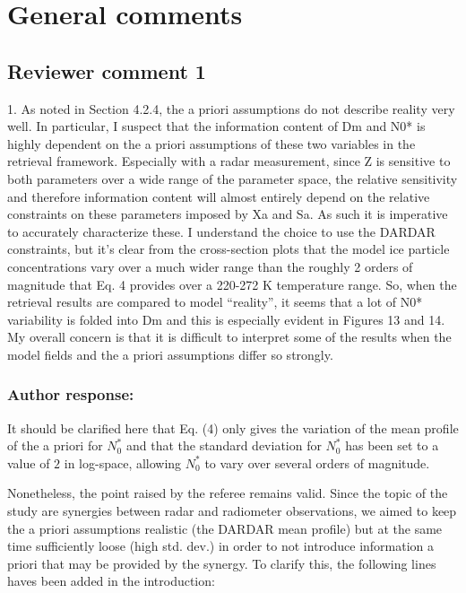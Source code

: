 \documentclass[11pt]{scrartcl}
\author{simon}
\date{\today}
\title{}
\begin{document}
\setlength{\parindent}{0cm}

\section{General comments}

\subsection*{Reviewer comment 1}

1. As noted in Section 4.2.4, the a priori assumptions do not describe reality
very well. In particular, I suspect that the information content of Dm and N0* is
highly dependent on the a priori assumptions of these two variables in the
retrieval framework. Especially with a radar measurement, since Z is sensitive to
both parameters over a wide range of the parameter space, the relative
sensitivity and therefore information content will almost entirely depend on the
relative constraints on these parameters imposed by Xa and Sa. As such it is
imperative to accurately characterize these. I understand the choice to use the
DARDAR constraints, but it’s clear from the cross-section plots that the model
ice particle concentrations vary over a much wider range than the roughly 2
orders of magnitude that Eq. 4 provides over a 220-272 K temperature range.
So, when the retrieval results are compared to model “reality”, it seems that a
lot of N0* variability is folded into Dm and this is especially evident in
Figures 13 and 14. My overall concern is that it is difficult to interpret some
of the results when the model fields and the a priori assumptions differ so
strongly.

\subsubsection*{Author response:}

It should be clarified here that Eq. (4) only gives the variation of the mean
profile of the a priori for $N_0^*$ and that the standard deviation for $N_0^*$
has been set to a value of $2$ in log-space, allowing $N_0^*$ to vary over several
orders of magnitude.

Nonetheless, the point raised by the referee remains valid. Since the topic
of the study are synergies between radar and radiometer observations, we aimed
to keep the a priori assumptions realistic (the DARDAR mean profile) but at the
same time sufficiently loose (high std. dev.) in order to not introduce information
a priori that may be provided by the synergy. To clarify this, the following
lines haves been added in the introduction:
\end{document}
